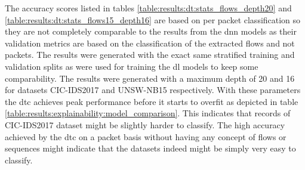 



The accuracy scores listed in tables \ref{table:results:dt:stats_flows_depth20} and \ref{table:results:dt:stats_flows15_depth16} are based on per packet classification so they are not completely comparable to the results from the \gls{dnn} models as their validation metrics are based on the classification of the extracted flows and not packets. The results were generated with the exact same stratified training and validation splits as were used for training the \gls{dl} models to keep some comparability. The results were generated with a maximum depth of 20 and 16 for datasets CIC-IDS2017 and UNSW-NB15 respectively. With these parameters the \gls{dtc} achieves peak performance before it starts to overfit as depicted in table \ref{table:results:explainability:model_comparison}. This indicates that records of CIC-IDS2017 dataset might be slightly harder to classify. The high accuracy achieved by the \gls{dtc} on a packet basis without having any concept of flows or sequences might indicate that the datasets indeed might be simply very easy to classify. 

